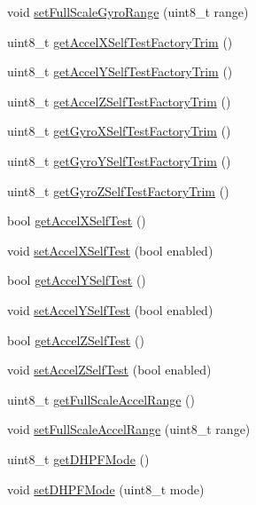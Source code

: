\begin{DoxyCompactItemize}
void \hyperlink{classMPU6050_a72afc0b6f221c9336f635b5637c62dae}{set\+Full\+Scale\+Gyro\+Range} (uint8\+\_\+t range)
\item 
uint8\+\_\+t \hyperlink{classMPU6050_a0cfaa7fbf63fb5867e003d490eb3fd96}{get\+Accel\+X\+Self\+Test\+Factory\+Trim} ()
\item 
uint8\+\_\+t \hyperlink{classMPU6050_ae219dc9651d4d42a918e553b03e4e7bf}{get\+Accel\+Y\+Self\+Test\+Factory\+Trim} ()
\item 
uint8\+\_\+t \hyperlink{classMPU6050_a455f63be2ea810cac26d583da6915050}{get\+Accel\+Z\+Self\+Test\+Factory\+Trim} ()
\item 
uint8\+\_\+t \hyperlink{classMPU6050_a9e50a2644c5ac8c9ac4270c86fd18a93}{get\+Gyro\+X\+Self\+Test\+Factory\+Trim} ()
\item 
uint8\+\_\+t \hyperlink{classMPU6050_ae3e0610d6d3bb8162c4d5c99e0f53106}{get\+Gyro\+Y\+Self\+Test\+Factory\+Trim} ()
\item 
uint8\+\_\+t \hyperlink{classMPU6050_a6aecb64dc804f1238e56626ae13b4c79}{get\+Gyro\+Z\+Self\+Test\+Factory\+Trim} ()
\item 
bool \hyperlink{classMPU6050_a8fc7eab1302281f6e4bc953379f3237b}{get\+Accel\+X\+Self\+Test} ()
\item 
void \hyperlink{classMPU6050_ac2ab843dc9d241056ed0f891195cdbf9}{set\+Accel\+X\+Self\+Test} (bool enabled)
\item 
bool \hyperlink{classMPU6050_a2523e798db3baf9cb9dbf347af16639b}{get\+Accel\+Y\+Self\+Test} ()
\item 
void \hyperlink{classMPU6050_ad5847430ab297959e4d0e9b81ba2e3ba}{set\+Accel\+Y\+Self\+Test} (bool enabled)
\item 
bool \hyperlink{classMPU6050_a57710638eeb6176cf14a8c444bda5300}{get\+Accel\+Z\+Self\+Test} ()
\item 
void \hyperlink{classMPU6050_a8eb8ba039af9a47e0475a3835b87f404}{set\+Accel\+Z\+Self\+Test} (bool enabled)
\item 
uint8\+\_\+t \hyperlink{classMPU6050_a0fe2dad60c170cee7d614e08f243ffd0}{get\+Full\+Scale\+Accel\+Range} ()
\item 
void \hyperlink{classMPU6050_a64eb78e8e359c541beaf8664db3421d1}{set\+Full\+Scale\+Accel\+Range} (uint8\+\_\+t range)
\item 
uint8\+\_\+t \hyperlink{classMPU6050_a4c3b84a906fcb5a65870fa557f797f4a}{get\+D\+H\+P\+F\+Mode} ()
\item 
void \hyperlink{classMPU6050_a44cc43aaad1e52c1ba3142d4490af611}{set\+D\+H\+P\+F\+Mode} (uint8\+\_\+t mode)
\item 

\end{DoxyCompactItemize}
